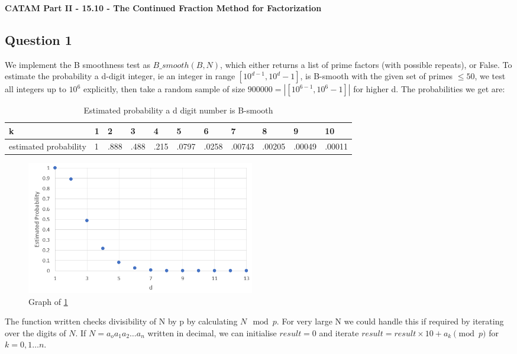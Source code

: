 \documentclass[10pt,a4paper]{report}
\begin{document}
\textbf{CATAM Part II - 15.10 - The Continued Fraction Method for
Factorization}


\subsection*{Question 1}
We implement the B smoothness test as $B\_smooth(B,N)$, which either returns a list of prime factors (with possible repeats), or False. To estimate the probability a d-digit integer, ie an integer in range $[10^{d-1},10^d-1]$, is B-smooth with the given set of primes $\leq 50$, we test all integers up to $10^6$ explicitly, then take a random sample of size $900000 = | [10^{6-1},10^6-1] |$ for higher d. The probabilities we get are:

\begin{table}[h]
\centering
\begin{tabular}{|l|l|l|l|l|l|l|l|l|l|l|}
\hline
k                     & 1 & 2    & 3    & 4    & 5     & 6     & 7      & 8      & 9      & 10     \\ \hline
estimated probability & 1 & .888 & .488 & .215 & .0797 & .0258 & .00743 & .00205 & .00049 & .00011 \\ \hline
\end{tabular}
\caption{Estimated probability a d digit number is B-smooth}
\label{tab:my-table}
\end{table}

\begin{figure}[h]
\centering
\includegraphics[width=10cm]{q1graph.png}
\caption{Graph of \ref{tab:my-table}}
\end{figure}

The function written checks divisibility of N by p by calculating $N \mod p$. For very large N we could handle this if required by iterating over the digits of $N$. If $N=a_oa_1a_2\dots a_n$ written in decimal, we can initialise $result=0$ and iterate $result=result\times10+a_k\pmod p$ for $k=0,1\dots n$.	
\end{document}
